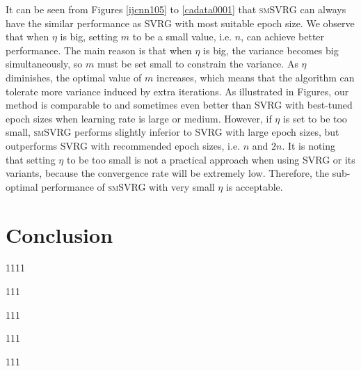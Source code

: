 \documentclass[conference]{IEEEtran}
\begin{document}
It can be seen from Figures \ref{ijcnn105} to \ref{cadata0001} that \textsc{smSVRG} can always have the similar performance as SVRG with most suitable epoch size. We observe that when $\eta$ is big, setting $m$ to be a small value, i.e. $n$, can achieve better performance. The main reason is that when $\eta$ is big, the variance becomes big simultaneously, so $m$ must be set  small to constrain the variance. As $\eta$ diminishes, the optimal value of $m$ increases, which means that the algorithm can tolerate more variance induced by extra iterations. As illustrated in Figures, our method is comparable to and sometimes even better than SVRG with best-tuned epoch sizes when learning rate is large or medium. However, if $\eta$ is set to be too small, \textsc{smSVRG} performs slightly inferior to  SVRG with large epoch sizes, but outperforms SVRG with recommended epoch sizes, i.e. $n$ and $2n$. It is noting that setting $\eta$ to be too small is not a practical approach when using SVRG or its variants, because the convergence rate will be extremely low. Therefore, the sub-optimal performance of \textsc{smSVRG} with very small $\eta$ is acceptable.
 

 

\section{Conclusion}
\label{conclusion}
1111

111

111

111

111






%
%
%


\newpage




\end{document}
